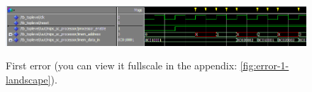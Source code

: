 \begin{figure}[h]
	\caption{First error (you can view it fullscale in the appendix:
\ref{fig:error-1-landscape}).}
	\includegraphics[scale=0.5]{figures/pc_error_annenhver_LITEN.png}
	\label{fig:error-1-text}
\end{figure}
